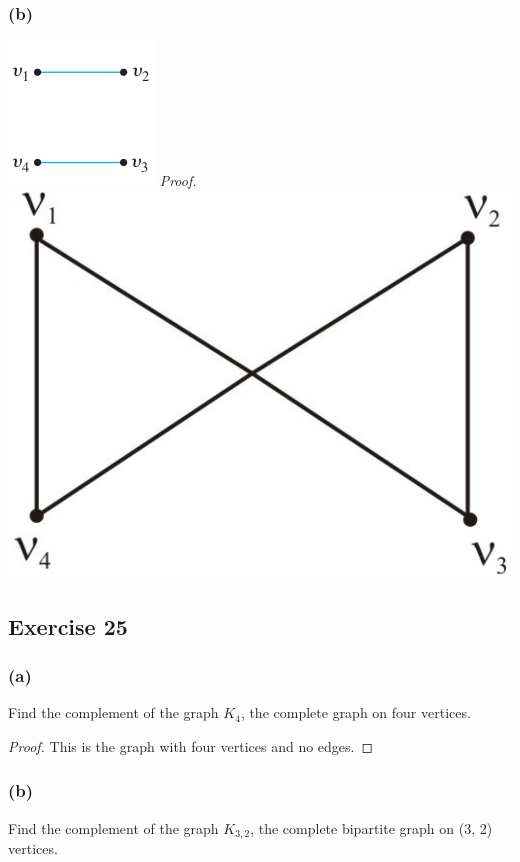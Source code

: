 \documentclass[14pt]{extarticle}
\begin{document}
\subsubsection{(b)}
\includegraphics[scale=0.5]{../images/10.1.24.b.1.png}
{\it Proof.}
\includegraphics[scale=0.1]{../images/10.1.24.b.2.png}

\subsection{Exercise 25}
\subsubsection{(a)}
Find the complement of the graph \(K_4\), the complete graph on four vertices.

\begin{proof}
This is the graph with four vertices and no edges.
\end{proof}

\subsubsection{(b)}
Find the complement of the graph \(K_{3,2}\), the complete bipartite graph on (3, 2) vertices.
\end{document}
